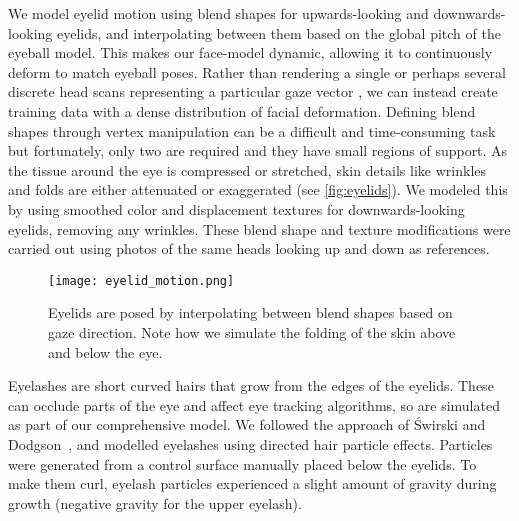 We model eyelid motion using blend shapes for upwards-looking and downwards-looking eyelids, and interpolating between them based on the global pitch of the eyeball model.
This makes our face-model dynamic, allowing it to continuously deform to match eyeball poses.
Rather than rendering a single or perhaps several discrete head scans representing a particular gaze vector \cite{sugano2014learning}, we can instead create training data with a dense distribution of facial deformation.
Defining blend shapes through vertex manipulation can be a difficult and time-consuming task but fortunately, only two are required and they have small regions of support.
As the tissue around the eye is compressed or stretched, skin details like wrinkles and folds are either attenuated or exaggerated (see \autoref{fig:eyelids}).
We modeled this by using smoothed color and displacement textures for downwards-looking eyelids, removing any wrinkles.
These blend shape and texture modifications were carried out using photos of the same heads looking up and down as references.

\begin{figure}
    \texttt{[image: eyelid\_motion.png]}
    \caption{Eyelids are posed by interpolating between blend shapes based on gaze direction. Note how we simulate the folding of the skin above and below the eye.}
    \label{fig:eyelids}
\end{figure}

Eyelashes are short curved hairs that grow from the edges of the eyelids.
These can occlude parts of the eye and affect eye tracking algorithms, so are simulated as part of our comprehensive model.
We followed the approach of {\'S}wirski and Dodgson~\cite{swirski2014rendering}, and modelled eyelashes using directed hair particle effects.
Particles were generated from a control surface manually placed below the eyelids.
To make them curl, eyelash particles experienced a slight amount of gravity during growth (negative gravity for the upper eyelash).